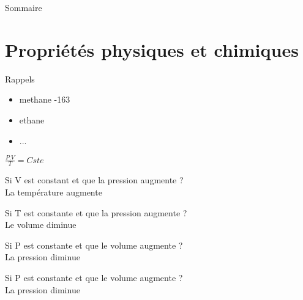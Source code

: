 \documentclass[xcolor=dvipsnames,hyperref={breaklinks=true},mathserif,
professionalfont,12pt]{beamer}
\author{Cyrille Reggio}
\begin{document}
    
    \begin{frame}{Sommaire}
        \tableofcontents
    \end{frame}

 \section{Propriétés physiques et chimiques}
\begin{frame}{Rappels}
 \begin{itemize}
  \item methane -163
  \item ethane
  \item ...
 \end{itemize}

\end{frame}

\begin{frame}
\centering

\large
 $\frac{P.V}{T}=Cste$
\end{frame}

\begin{frame}
 Si V est constant et que la pression augmente ?\\
 \pause La température augmente
\end{frame}

\begin{frame}
 Si T est constante et que la pression augmente ?\\
 \pause Le volume diminue
\end{frame}

\begin{frame}
 Si P est constante et que le volume augmente ?\\
 \pause La pression diminue
\end{frame}

\begin{frame}
 Si P est constante et que le volume augmente ?\\
 \pause La pression diminue
\end{frame}
\end{document}
